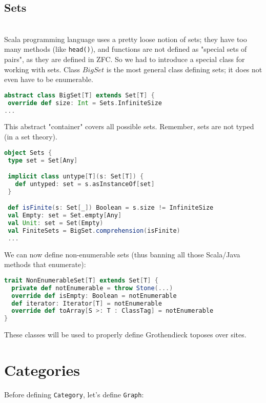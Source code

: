 \documentclass[10pt]{asme2ej}
\begin{document}
\subsection{Sets}
 \\
Scala programming language uses a pretty loose notion of sets; they have too many methods (like \verb+head()+), and functions are not defined as "special sets of pairs", as they are defined in ZFC. So we had to introduce a special class for working with sets. Class $BigSet$ is the most general class defining sets; it does not even have to be enumerable.

\begin{lstlisting}[language=Scala]
abstract class BigSet[T] extends Set[T] {
 override def size: Int = Sets.InfiniteSize
...
\end{lstlisting}

This abstract "container" covers all possible sets.
Remember, sets are not typed (in a set theory).

\begin{lstlisting}[language=Scala]
object Sets {                                     
 type set = Set[Any]

 implicit class untype[T](s: Set[T]) {
   def untyped: set = s.asInstanceOf[set]
 }

 def isFinite(s: Set[_]) Boolean = s.size != InfiniteSize
 val Empty: set = Set.empty[Any]
 val Unit: set = Set(Empty)
 val FiniteSets = BigSet.comprehension(isFinite)
 ...
\end{lstlisting}

We can now define non-enumerable sets (thus banning all those Scala/Java methods that enumerate):

\begin{lstlisting}[language=Scala]
trait NonEnumerableSet[T] extends Set[T] {
  private def notEnumerable = throw Stone(...)
  override def isEmpty: Boolean = notEnumerable
  def iterator: Iterator[T] = notEnumerable
  override def toArray[S >: T : ClassTag] = notEnumerable
}
\end{lstlisting}

These classes will be used to properly define Grothendieck toposes over sites.


\section{Categories}

Before defining \verb+Category+, let's define \verb+Graph+:
\end{document}
